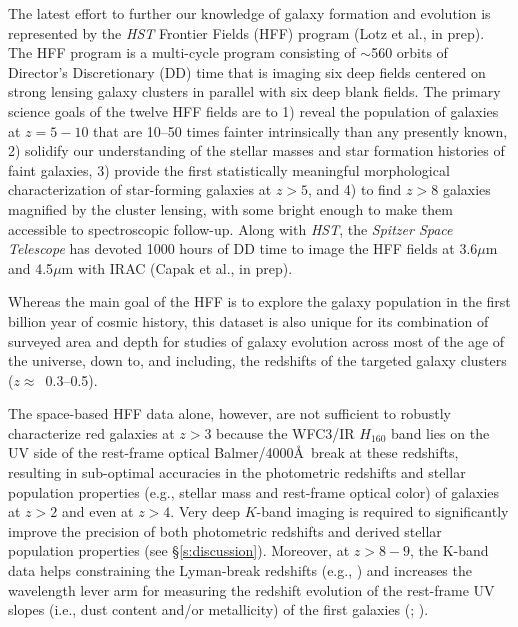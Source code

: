 \documentclass[preprint2]{aastex6}
\begin{document}
The latest effort to further our knowledge of galaxy formation and evolution is represented by the {\it HST} Frontier Fields (HFF) program (Lotz et al., in prep). The HFF program is a multi-cycle program consisting of $\sim$560 orbits of Director's Discretionary (DD) time that is imaging six deep fields centered on strong lensing galaxy clusters in parallel with six deep blank fields. The primary science goals of the twelve HFF fields are to 1) reveal the population of galaxies at $z=5-10$ that are 10--50 times fainter intrinsically than any presently known, 2) solidify our understanding of the stellar masses and star formation histories of faint galaxies, 3) provide the first statistically meaningful morphological characterization of star-forming galaxies at $z>5$, and 4) to find $z>8$ galaxies magnified by the cluster lensing, with some bright enough to make them accessible to spectroscopic follow-up. Along with {\it HST}, the {\it Spitzer Space Telescope} has devoted 1000 hours of DD time to image the HFF fields at 3.6$\mu$m and 4.5$\mu$m with IRAC (Capak et al., in prep). 

Whereas the main goal of the HFF is to explore the galaxy population in the first billion year of cosmic history, this dataset is also unique for its combination of surveyed area and depth for studies of galaxy evolution across most of the age of the universe, down to, and including, the redshifts of the targeted galaxy clusters ($z\approx$~0.3--0.5). 

The space-based HFF data alone, however, are not sufficient to robustly characterize red galaxies at $z>3$ because the WFC3/IR $H_{160}$ band lies on the UV side of the rest-frame optical Balmer/4000\AA~break at these redshifts, resulting in sub-optimal accuracies in the photometric redshifts and stellar population properties (e.g., stellar mass and rest-frame optical color) of galaxies at $z>2$ and even at $z>4$. Very deep $K$-band imaging is required to significantly improve the precision of both photometric redshifts and derived stellar population properties (see \S\ref{s:discussion}). Moreover, at $z>8-9$, the K-band data helps constraining the Lyman-break redshifts (e.g., \citealt{bouwens:13}) and increases the wavelength lever arm for measuring the redshift evolution of the rest-frame UV slopes (i.e., dust content and/or metallicity) of the first galaxies (\citealt{bouwens:12a}; \citealt{bouwens:13}).
\end{document}
